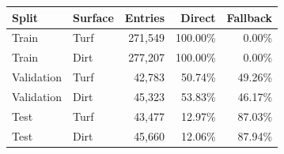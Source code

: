 \begin{tabular}{llrrr}
\hline
Split & Surface & Entries & Direct & Fallback \\
\hline
Train & Turf & 271,549 & 100.00\% & 0.00\% \\
Train & Dirt & 277,207 & 100.00\% & 0.00\% \\
Validation & Turf & 42,783 & 50.74\% & 49.26\% \\
Validation & Dirt & 45,323 & 53.83\% & 46.17\% \\
Test & Turf & 43,477 & 12.97\% & 87.03\% \\
Test & Dirt & 45,660 & 12.06\% & 87.94\% \\
\hline
\end{tabular}
